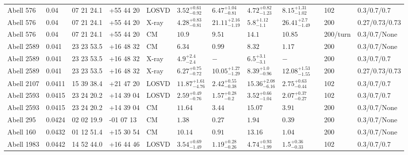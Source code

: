 \begin{landscape}
\begin{center}
{\begin{longtable}{llllllllllll}
Abell 576 & 0.04 & 07 21 24.1 & +55 44 20 & LOSVD & ${3.52}^{+0.61}_{-0.92}$ & ${6.47}^{+1.04}_{-0.81}$ & ${4.72}^{+0.82}_{-1.23}$ & ${8.15}^{+1.31}_{-1.02}$ & \citet{WO10.1} & 102 & 0.3/0.7/0.7 \\
Abell 576 & 0.04 & 07 21 24.1 & +55 44 20 & X-ray & ${4.28}^{+0.83}_{-0.81}$ & ${21.11}^{+2.16}_{-1.19}$ & ${5.8}^{+1.12}_{-1.1}$ & ${26.41}^{+2.7}_{-1.49}$ & \citet{BA14.1} & 200 & 0.27/0.73/0.73 \\
Abell 576 & 0.04 & 07 21 24.1 & +55 44 20 & CM & ${10.9}^{}_{}$ & ${9.51}^{}_{}$ & ${14.1}^{}_{}$ & ${10.85}^{}_{}$ & \citet{RI03.1} & 200/turn & 0.3/0.7/None \\
Abell 2589 & 0.041 & 23 23 53.5 & +16 48 32 & CM & ${6.34}^{}_{}$ & ${0.99}^{}_{}$ & ${8.32}^{}_{}$ & ${1.17}^{}_{}$ & \citet{RI06.1} & 200 & 0.3/0.7/None \\
Abell 2589 & 0.041 & 23 23 53.5 & +16 48 32 & X-ray & ${4.9}^{+2.4}_{-2.4}$ & ${-}^{}_{}$ & ${6.5}^{+3.1}_{-3.1}$ & ${-}^{}_{}$ & \citet{BU04.1} & 200 & 0.3/0.7/0.7 \\
Abell 2589 & 0.041 & 23 23 53.5 & +16 48 32 & X-ray & ${6.27}^{+0.75}_{-0.72}$ & ${10.05}^{+1.27}_{-1.29}$ & ${8.39}^{+1.0}_{-0.96}$ & ${12.08}^{+1.53}_{-1.55}$ & \citet{BA14.1} & 200 & 0.27/0.73/0.73 \\
Abell 2107 & 0.0411 & 15 39 38.4 & +21 47 20 & LOSVD & ${11.87}^{+1.61}_{-4.76}$ & ${2.42}^{+0.55}_{-0.38}$ & ${15.36}^{+2.08}_{-6.16}$ & ${2.75}^{+0.63}_{-0.44}$ & \citet{WO10.1} & 102 & 0.3/0.7/0.7 \\
Abell 2593 & 0.0415 & 23 24 20.2 & +14 39 04 & LOSVD & ${2.59}^{+0.49}_{-0.76}$ & ${1.57}^{+0.28}_{-0.2}$ & ${3.52}^{+0.66}_{-1.04}$ & ${2.07}^{+0.37}_{-0.27}$ & \citet{WO10.1} & 102 & 0.3/0.7/0.7 \\
Abell 2593 & 0.0415 & 23 24 20.2 & +14 39 04 & CM & ${11.64}^{}_{}$ & ${3.44}^{}_{}$ & ${15.07}^{}_{}$ & ${3.91}^{}_{}$ & \citet{RI06.1} & 200 & 0.3/0.7/None \\
Abell 295 & 0.0424 & 02 02 19.9 & -01 07 13 & CM & ${1.38}^{}_{}$ & ${0.27}^{}_{}$ & ${1.94}^{}_{}$ & ${0.39}^{}_{}$ & \citet{RI06.1} & 200 & 0.3/0.7/None \\
Abell 160 & 0.0432 & 01 12 51.4 & +15 30 54 & CM & ${10.14}^{}_{}$ & ${0.91}^{}_{}$ & ${13.16}^{}_{}$ & ${1.04}^{}_{}$ & \citet{RI06.1} & 200 & 0.3/0.7/None \\
Abell 1983 & 0.0442 & 14 52 44.0 & +16 44 46 & LOSVD & ${3.54}^{+0.69}_{-1.49}$ & ${1.19}^{+0.28}_{-0.26}$ & ${4.74}^{+0.93}_{-1.99}$ & ${1.5}^{+0.36}_{-0.33}$ & \citet{WO10.1} & 102 & 0.3/0.7/0.7 \\

\end{longtable}}
\end{center}
\end{landscape}
